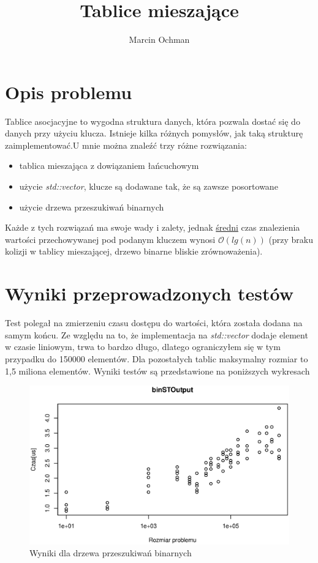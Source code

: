 \documentclass[10pt,a4paper]{article}
\author{Marcin Ochman}
\title{Tablice mieszające}
\begin{document}
\maketitle
\section{Opis problemu}

Tablice asocjacyjne to wygodna struktura danych, która pozwala dostać się do danych przy użyciu
klucza. Istnieje kilka różnych pomysłów, jak taką strukturę zaimplementować.U mnie można znaleźć
trzy różne rozwiązania:
\begin{itemize}
\item tablica mieszająca z dowiązaniem łańcuchowym
\item użycie \textit{std::vector}, klucze są dodawane tak, że są zawsze posortowane
\item użycie drzewa przeszukiwań binarnych 
\end{itemize}

Każde z tych rozwiązań ma swoje wady i zalety, jednak \underline{średni} czas znalezienia wartości
przechowywanej pod podanym kluczem wynosi $\mathcal{O}(lg(n))$ (przy braku kolizji w tablicy
mieszającej, drzewo binarne bliskie zrównoważenia).


\section{Wyniki przeprowadzonych testów}

Test polegał na zmierzeniu czasu dostępu do wartości, która została dodana na samym końcu.
Ze względu na to, że implementacja na \textit{std::vector} dodaje element w czasie 
liniowym, trwa to bardzo długo, dlatego ograniczyłem się w tym przypadku do 150000 
elementów. Dla pozostałych tablic maksymalny rozmiar to 1,5 miliona elementów. Wyniki testów są 
przedstawione na poniższych wykresach

\begin{figure}[H]
\centering
\includegraphics[width=0.7\linewidth]{./Wykresy/binSTOutput}
\caption{Wyniki dla drzewa przeszukiwań binarnych}
\label{fig:binSTOutput}
\end{figure}
\end{document}
